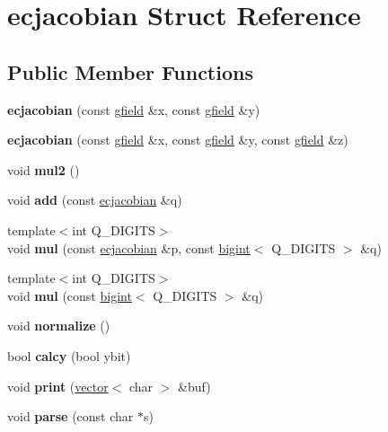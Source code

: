 \hypertarget{structecjacobian}{}\section{ecjacobian Struct Reference}
\label{structecjacobian}
\subsection*{Public Member Functions}
\begin{DoxyCompactItemize}
\item 
\mbox{\label{structecjacobian_a05218cdae34aaee8a61f8046452224fe}} 
{\bfseries ecjacobian} (const \hyperlink{structgfield}{gfield} \&x, const \hyperlink{structgfield}{gfield} \&y)
\item 
\mbox{\label{structecjacobian_ab7b28dee64ba750d1964bb38f2c4ef3e}} 
{\bfseries ecjacobian} (const \hyperlink{structgfield}{gfield} \&x, const \hyperlink{structgfield}{gfield} \&y, const \hyperlink{structgfield}{gfield} \&z)
\item 
\mbox{\label{structecjacobian_af7b92c34cc52b270a8ca85dd124ddb2b}} 
void {\bfseries mul2} ()
\item 
\mbox{\label{structecjacobian_a8d0f54c79fb5e40433b75fc9ca895e87}} 
void {\bfseries add} (const \hyperlink{structecjacobian}{ecjacobian} \&q)
\item 
\mbox{\label{structecjacobian_a9da0182495ad309dcaf189a32c8de79c}} 
{\footnotesize template$<$int Q\+\_\+\+D\+I\+G\+I\+TS$>$ }\\void {\bfseries mul} (const \hyperlink{structecjacobian}{ecjacobian} \&p, const \hyperlink{structbigint}{bigint}$<$ Q\+\_\+\+D\+I\+G\+I\+TS $>$ \&q)
\item 
\mbox{\label{structecjacobian_ae6f7f0bb6cc754cedfce1b3befb63b9b}} 
{\footnotesize template$<$int Q\+\_\+\+D\+I\+G\+I\+TS$>$ }\\void {\bfseries mul} (const \hyperlink{structbigint}{bigint}$<$ Q\+\_\+\+D\+I\+G\+I\+TS $>$ \&q)
\item 
\mbox{\label{structecjacobian_ad09a88474b98d2c327c6dca6f5ff6a6f}} 
void {\bfseries normalize} ()
\item 
\mbox{\label{structecjacobian_a40a477b7acb8e9b0a6fa1656f5de9505}} 
bool {\bfseries calcy} (bool ybit)
\item 
\mbox{\label{structecjacobian_a3961d9ec5bc904dc559866471f9c4df2}} 
void {\bfseries print} (\hyperlink{structvector}{vector}$<$ char $>$ \&buf)
\item 
\mbox{\label{structecjacobian_a6f454e80faefed944a0238f0e0a96941}} 
void {\bfseries parse} (const char $\ast$s)
\end{DoxyCompactItemize}

